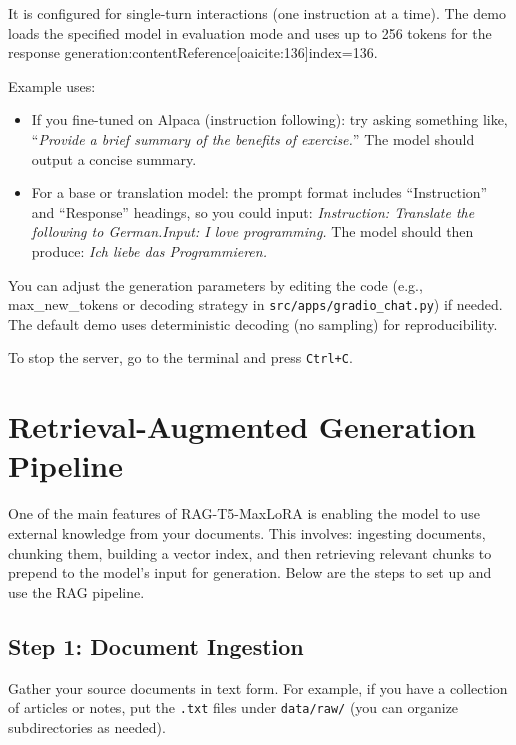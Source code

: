 \documentclass{article}
\begin{document}
It is configured for single-turn interactions (one instruction at a time). The demo loads the specified model in evaluation mode and uses up to 256 tokens for the response generation:contentReference[oaicite:136]{index=136}.

Example uses:
\begin{itemize}
    \item If you fine-tuned on Alpaca (instruction following): try asking something like, “\emph{Provide a brief summary of the benefits of exercise.}” The model should output a concise summary.
    \item For a base or translation model: the prompt format includes “Instruction” and “Response” headings, so you could input: \emph{Instruction: Translate the following to German.\newline Input: I love programming.} The model should then produce: \emph{Ich liebe das Programmieren.}
\end{itemize}

You can adjust the generation parameters by editing the code (e.g., max_new_tokens or decoding strategy in \texttt{src/apps/gradio\_chat.py}) if needed. The default demo uses deterministic decoding (no sampling) for reproducibility.

To stop the server, go to the terminal and press \texttt{Ctrl+C}.

\section{Retrieval-Augmented Generation Pipeline}
One of the main features of RAG-T5-MaxLoRA is enabling the model to use external knowledge from your documents. This involves: ingesting documents, chunking them, building a vector index, and then retrieving relevant chunks to prepend to the model’s input for generation. Below are the steps to set up and use the RAG pipeline.

\subsection{Step 1: Document Ingestion}
Gather your source documents in text form. For example, if you have a collection of articles or notes, put the \texttt{.txt} files under \texttt{data/raw/} (you can organize subdirectories as needed).
\end{document}
